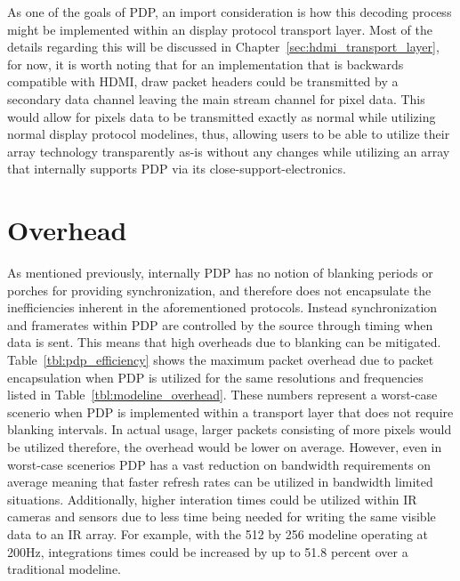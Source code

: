     As one of the goals of PDP, an import consideration is how this decoding process might be implemented within an display protocol transport layer. Most of the details regarding this will be discussed in Chapter~\ref{sec:hdmi_transport_layer}, for now, it is worth noting that for an implementation that is backwards compatible with HDMI, draw packet headers could be transmitted by a secondary data channel leaving the main stream channel for pixel data. This would allow for pixels data to be transmitted exactly as normal while utilizing normal display protocol modelines, thus, allowing users to be able to utilize their array technology transparently as-is without any changes while utilizing an array that internally supports PDP via its close-support-electronics.

\section{Overhead}
    As mentioned previously, internally PDP has no notion of blanking periods or porches for providing synchronization, and therefore does not encapsulate the inefficiencies inherent in the aforementioned protocols. Instead synchronization and framerates within PDP are controlled by the source through timing when data is sent. This means that high overheads due to blanking can be mitigated. Table~\ref{tbl:pdp_efficiency} shows the maximum packet overhead due to packet encapsulation when PDP is utilized for the same resolutions and frequencies listed in Table~\ref{tbl:modeline_overhead}. These numbers represent a worst-case scenerio when PDP is implemented within a transport layer that does not require blanking intervals. In actual usage, larger packets consisting of more pixels would be utilized therefore, the overhead would be lower on average. However, even in worst-case scenerios PDP has a vast reduction on bandwidth requirements on average meaning that faster refresh rates can be utilized in bandwidth limited situations. Additionally, higher interation times could be utilized within IR cameras and sensors due to less time being needed for writing the same visible data to an IR array. For example, with the 512 by 256 modeline operating at 200Hz, integrations times could be increased by up to 51.8 percent over a traditional modeline.

